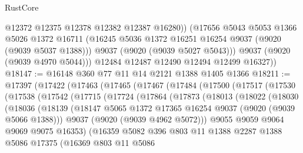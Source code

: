 \begin{lexlean}{RustCore}
\begin{coremodule}
              @12372
              @12375
              @12378
              @12382
              @12387
              @16280))
          (@17656
            @5043
            @5053
            @1366
            @5026
            @1372
            @16711
            (@16245 @5036 @1372 @16251 @16254 @9037 (@9020 (@9039 @5037 @1388)))
            @9037
            (@9020 (@9039 @5027 @5043)))
          @9037
          (@9020 (@9039 @4970 @5044)))
        @12484
        @12487
        @12490
        @12494
        @12499
        @16327))
@18147 := @16148 @360 @77 @11 @14 @2121 @1388 @1405 @1366
@18211 := @17397
    (@17422
      (@17463
        (@17465
          (@17467
            (@17484
              (@17500
                (@17517
                  (@17530
                    (@17538
                      (@17542
                        (@17715
                          (@17724
                            (@17864
                              (@17873
                                (@18013
                                  (@18022
                                    (@18030
                                      (@18036
                                        (@18139
                                          (@18147
                                            @5065
                                            @1372
                                            @17365
                                            @16254
                                            @9037
                                            (@9020 (@9039 @5066 @1388)))
                                          @9037
                                          (@9020 (@9039 @4962 @5072)))
                                        @9055
                                        @9059
                                        @9064
                                        @9069
                                        @9075
                                        @16353)
                                      (@16359
                                        @5082
                                        @396
                                        @803
                                        @11
                                        @1388
                                        @2287
                                        @1388
                                        @5086
                                        @17375
                                        (@16369
                                          @803
                                          @11
                                          @5086

\end{coremodule}
\end{lexlean}
